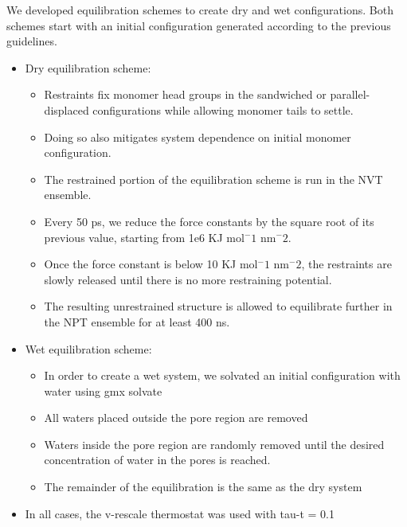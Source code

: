 \documentclass{article}
\begin{document}
  We developed equilibration schemes to create dry and wet configurations. Both schemes 
  start with an initial configuration generated according to the previous guidelines.
  \begin{itemize}
      \item Dry equilibration scheme:
      \begin{itemize}
          \item Restraints fix monomer head groups in the sandwiched or parallel-displaced
          configurations while allowing monomer tails to settle.
          \item Doing so also mitigates system dependence on initial monomer configuration.
          \item The restrained portion of the equilibration scheme is run in the NVT ensemble.
          \item Every 50 ps, we reduce the force constants by the square root of its
          previous value, starting from 1e6 KJ mol$^-1$ nm$^-2$.
          \item Once the force constant is below 10 KJ mol$^-1$ nm$^-2$, the restraints are
          slowly released until there is no more restraining potential.
          \item The resulting unrestrained structure is allowed to equilibrate further in the NPT
          ensemble for at least 400 ns.
      \end{itemize}
      \item Wet equilibration scheme: 
      \begin{itemize}
	  \item In order to create a wet system, we solvated an initial configuration with water using gmx solvate
          \item All waters placed outside the pore region are removed 
	  \item Waters inside the pore region are randomly removed until the desired concentration
	  of water in the pores is reached. 
	  \item The remainder of the equilibration is the same as the dry system
      \end{itemize}
      \item In all cases, the v-rescale thermostat was used with tau-t = 0.1 %
  \end{itemize}
\end{document}
